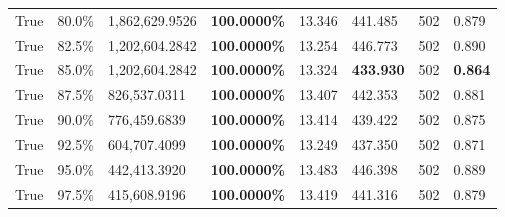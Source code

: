 \begin{table}[H]
\begin{tabular}{lllrllll}
\cline{1-8}
True & 80.0\% & 1,862,629.9526 & \bfseries \color{red} 100.0000\% & 13.346 & 441.485 & 502 & 0.879 \\
\cline{1-8}
True & 82.5\% & 1,202,604.2842 & \bfseries \color{red} 100.0000\% & 13.254 & 446.773 & 502 & 0.890 \\
\cline{1-8}
True & 85.0\% & 1,202,604.2842 & \bfseries \color{red} 100.0000\% & 13.324 & \bfseries \color{red} 433.930 & 502 & \bfseries \color{red} 0.864 \\
\cline{1-8}
True & 87.5\% & 826,537.0311 & \bfseries \color{red} 100.0000\% & 13.407 & 442.353 & 502 & 0.881 \\
\cline{1-8}
True & 90.0\% & 776,459.6839 & \bfseries \color{red} 100.0000\% & 13.414 & 439.422 & 502 & 0.875 \\
\cline{1-8}
True & 92.5\% & 604,707.4099 & \bfseries \color{red} 100.0000\% & 13.249 & 437.350 & 502 & 0.871 \\
\cline{1-8}
True & 95.0\% & 442,413.3920 & \bfseries \color{red} 100.0000\% & 13.483 & 446.398 & 502 & 0.889 \\
\cline{1-8}
True & 97.5\% & 415,608.9196 & \bfseries \color{red} 100.0000\% & 13.419 & 441.316 & 502 & 0.879 \\
\cline{1-8}
\bottomrule
\end{tabular}
\end{table}

